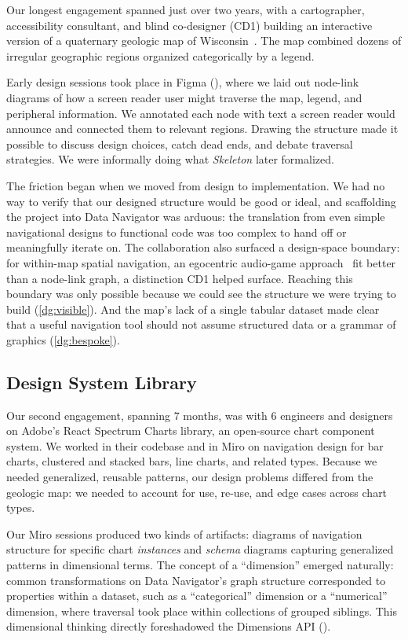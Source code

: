 \documentclass[12pt]{cmuthesis}
\begin{document}
Our longest engagement spanned just over two years, with a cartographer, accessibility consultant, and blind co-designer (CD1) building an interactive version of a quaternary geologic map of Wisconsin~\cite{Rawling2025}. The map combined dozens of irregular geographic regions organized categorically by a legend.

Early design sessions took place in Figma (), where we laid out node-link diagrams of how a screen reader user might traverse the map, legend, and peripheral information. We annotated each node with text a screen reader would announce and connected them to relevant regions. Drawing the structure made it possible to discuss design choices, catch dead ends, and debate traversal strategies. We were informally doing what \textit{Skeleton} later formalized.

The friction began when we moved from design to implementation. We had no way to verify that our designed structure would be good or ideal, and scaffolding the project into Data Navigator was arduous: the translation from even simple navigational designs to functional code was too complex to hand off or meaningfully iterate on. The collaboration also surfaced a design-space boundary: for within-map spatial navigation, an egocentric audio-game approach~\cite{Biggs2022Audiom} fit better than a node-link graph, a distinction CD1 helped surface. Reaching this boundary was only possible because we could see the structure we were trying to build (\ref{dg:visible}). And the map's lack of a single tabular dataset made clear that a useful navigation tool should not assume structured data or a grammar of graphics (\ref{dg:bespoke}).

\subsection{Design System Library}
\label{sec:designsystem}

Our second engagement, spanning 7 months, was with 6 engineers and designers on Adobe's React Spectrum Charts library, an open-source chart component system. We worked in their codebase and in Miro on navigation design for bar charts, clustered and stacked bars, line charts, and related types. Because we needed generalized, reusable patterns, our design problems differed from the geologic map: we needed to account for use, re-use, and edge cases across chart types.

Our Miro sessions produced two kinds of artifacts: diagrams of navigation structure for specific chart \textit{instances} and \textit{schema} diagrams capturing generalized patterns in dimensional terms. The concept of a ``dimension'' emerged naturally: common transformations on Data Navigator's graph structure corresponded to properties within a dataset, such as a ``categorical'' dimension or a ``numerical'' dimension, where traversal took place within collections of grouped siblings. This dimensional thinking directly foreshadowed the Dimensions API ().
\end{document}
